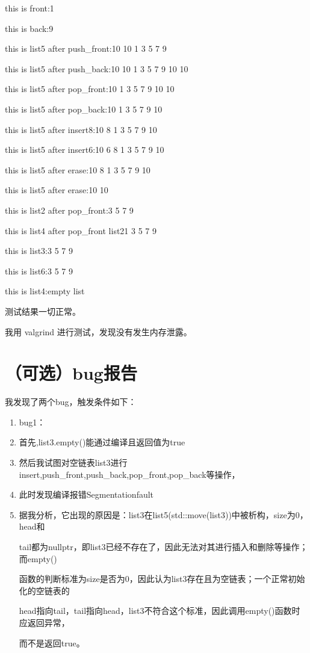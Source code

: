 \documentclass[UTF8]{ctexart}
\begin{document}
this is front:1

this is back:9

this is list5 after push\_front:10 10 1 3 5 7 9

this is list5 after push\_back:10 10 1 3 5 7 9 10 10

this is list5 after pop\_front:10 1 3 5 7 9 10 10

this is list5 after pop\_back:10 1 3 5 7 9 10

this is list5 after insert8:10 8 1 3 5 7 9 10

this is list5 after insert6:10 6 8 1 3 5 7 9 10

this is list5 after erase:10 8 1 3 5 7 9 10

this is list5 after erase:10 10

this is list2 after pop\_front:3 5 7 9

this is list4 after pop\_front list21 3 5 7 9

this is list3:3 5 7 9

this is list6:3 5 7 9

this is list4:empty list

测试结果一切正常。

我用 valgrind 进行测试，发现没有发生内存泄露。

\section{（可选）bug报告}

我发现了两个bug，触发条件如下：


\begin{enumerate}
  \item bug1：
  
  \item 首先,list3.empty()能通过编译且返回值为true
    
  \item 然后我试图对空链表list3进行insert,push\_front,push\_back,pop\_front,pop\_back等操作，
    
  \item 此时发现编译报错Segmentationfault
    
  \item 据我分析，它出现的原因是：list3在list5(std::move(list3))中被析构，size为0，head和
    
    tail都为nullptr，即list3已经不存在了，因此无法对其进行插入和删除等操作；而empty()
    
    函数的判断标准为size是否为0，因此认为list3存在且为空链表；一个正常初始化的空链表的
    
    head指向tail，tail指向head，list3不符合这个标准，因此调用empty()函数时应返回异常，
    
    而不是返回true。
\end{enumerate}   
\end{document}
